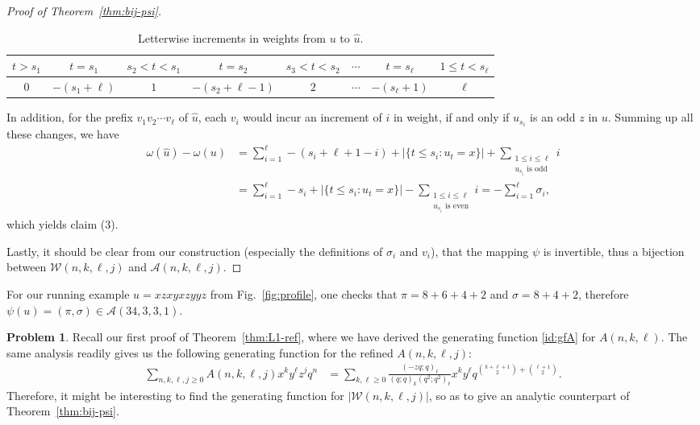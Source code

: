 \documentclass[11pt,reqno]{amsart}
\numberwithin{equation}{section}
\theoremstyle{plain}
\theoremstyle{definition}
\newtheorem{?}[theorem]{Problem}
\newcommand{\A}{\mathcal{A}}
\newcommand{\W}{\mathcal{W}}
\begin{document}
\begin{proof}[Proof of Theorem~\ref{thm:bij-psi}]
\begin{table}[h]
{\small
\begin{tabular}{c|c|c|c|c|c|c|c}
\hline
$t>s_1$ & $t=s_1$ & $s_2<t<s_1$ & $t=s_2$ & $s_3<t<s_2$ & $\cdots$ & $t=s_{\ell}$ & $1\le t<s_{\ell}$\\
\hline
$0$ & $-(s_1+\ell)$ & $1$ & $-(s_2+\ell-1)$ & $2$ & $\cdots$ & $-(s_{\ell}+1)$ & $\ell$\\
\hline
\end{tabular}
}
\vspace{2mm}
\caption{Letterwise increments in weights from $u$ to $\hat{u}$.}
\label{interval}
\end{table}
In addition, for the prefix $v_1v_2\cdots v_{\ell}$ of $\hat{u}$, each $v_i$ would incur an increment of $i$ in weight, if and only if $u_{s_i}$ is an odd $z$ in $u$. Summing up all these changes, we have
\begin{align*}
\omega(\hat{u})-\omega(u) &= \sum_{i=1}^{\ell}-(s_i+\ell+1-i)+|\{t\le s_i:u_t=x\}|+\sum_{\substack{1\le i\le \ell \\ \text{$u_{s_i}$ is odd}}}i \\
&= \sum_{i=1}^{\ell}-s_i+|\{t\le s_i:u_t=x\}|-\sum_{\substack{1\le i\le \ell \\ \text{$u_{s_i}$ is even}}}i =-\sum_{i=1}^{\ell} \sigma_i,
\end{align*}
which yields claim (3).

Lastly, it should be clear from our construction (especially the definitions of $\sigma_i$ and $v_i$), that the mapping $\psi$ is invertible, thus a bijection between $\W(n,k,\ell,j)$ and $\A(n,k,\ell,j)$.
\end{proof}

For our running example $u=xzxyxzyyz$ from Fig.~\ref{fig:profile}, one checks that $\pi=8+6+4+2$ and $\sigma=8+4+2$, therefore $\psi(u)=(\pi,\sigma)\in\A(34,3,3,1)$.

\begin{?}
Recall our first proof of Theorem~\ref{thm:L1-ref}, where we have derived the generating function \eqref{id:gfA} for $A(n,k,\ell)$. The same analysis readily gives us the following generating function for the refined $A(n,k,\ell,j)$:
\begin{align*}
\sum_{n,k,\ell,j\ge 0}A(n,k,\ell,j)x^k y^{\ell} z^j q^n &= \sum_{k,\ell\ge 0}\frac{(-zq;q)_{\ell}}{(q;q)_k(q^2;q^2)_{\ell}}x^k y^{\ell}q^{\binom{k+\ell+1}{2}+\binom{\ell+1}{2}}.
\end{align*}
Therefore, it might be interesting to find the generating function for $|\W(n,k,\ell,j)|$, so as to give an analytic counterpart of Theorem~\ref{thm:bij-psi}.
\end{?}
\end{document}
